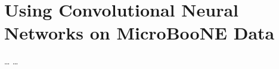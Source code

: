 \chapter{Using Convolutional Neural Networks on MicroBooNE Data}\label{ch:data}
\dots 
\clearpage
\dots
